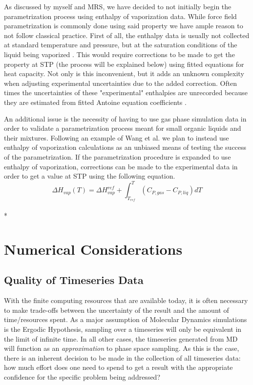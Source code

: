 \documentclass[aps,pre,twocolumn,nofootinbib,superscriptaddress,linenumbers,10pt, draft,tightenlines]{revtex4-1}
\begin{document}
As discussed by myself and MRS, we have decided to not initially begin the parametrization process using enthalpy of vaporization data. While force field parametrization is commonly done using said property we have ample reason to not follow classical practice. First of all, the enthalpy data is usually not collected at standard temperature and pressure, but at the saturation conditions of the liquid being vaporized \cite{chickos}.  This would require corrections to be made to get the property at STP (the process will be explained below) using fitted equations for heat capacity. Not only is this inconvenient, but it adds an unknown complexity when adjusting experimental uncertainties due to the added correction. Often times the uncertainties of these "experimental" enthalpies are unrecorded because they are estimated from fitted Antoine equation coefficients \cite{chickos}. 

An additional issue is the necessity of having to use gas phase simulation data in order to validate a parametrization process meant for small organic liquids and their mixtures. Following an example of Wang et al. \cite{FF99vdw} we plan to instead use enthalpy of vaporization calculations as an unbiased means of testing the success of the parametrization. If the parametrization procedure is expanded to use enthalpy of vaporization, corrections can be made to the experimental data in order to get a value at STP using the following equation.
\begin{equation}\Delta H_{vap}(T) = \Delta H_{vap}^{ref} + \int_{T_{ref}}^T \left(C_{P, gas} - C_{P, liq}\right) dT \end{equation}\\*

\section{Numerical Considerations}

\subsection{Quality of Timeseries Data}
With the finite computing resources that are available today, it is often necessary to make trade-offs between the uncertainty of the result and the amount of time/resources spent.  As a major assumption of Molecular Dynamics simulations is the Ergodic Hypothesis, sampling over a timeseries will only be equivalent in the limit of infinite time. In all other cases, the timeseries generated from MD will function as an \emph{approximation} to phase space sampling. As this is the case, there is an inherent decision to be made in the collection of all timeseries data: how much effort does one need to spend to get a result with the appropriate confidence for the specific problem being addressed? 
\end{document}
